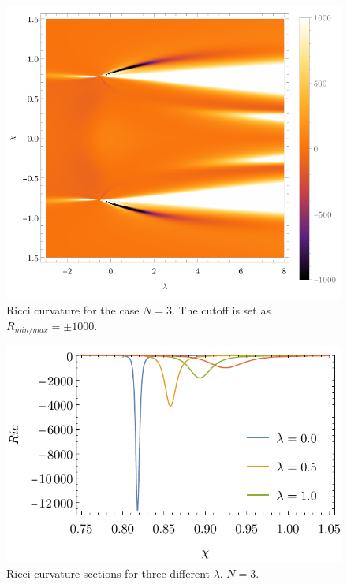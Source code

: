 \begin{figure}[H]
    \centering
    \includegraphics{../img/N=3_Ricci.pdf}
    \caption{Ricci curvature for the case $N=3$. The cutoff is set as $R_{min/max}=\pm1000$.}
    \label{fig:N=3_Ricci}
\end{figure}

\begin{figure}[H]
    \centering
    \vspace{40pt}\includegraphics[scale=0.9]{../img/N=3_Ricci_section.pdf}
    \caption{Ricci curvature sections for three different $\lambda$. $N=3$.}
    \label{fig:N=3_Ricci_section}
\end{figure}

